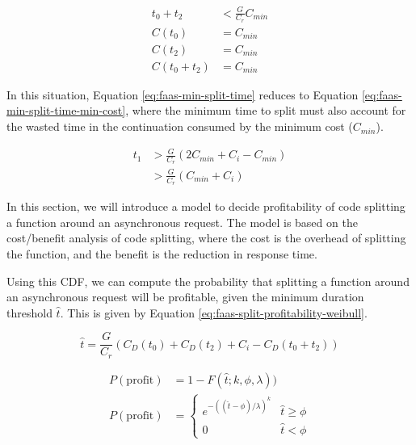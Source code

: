 \begin{equation} \label{eq:faas-min-split-time-pathological-scenario}
\begin{aligned}
t_0 + t_2 & < \frac{G}{C_r} C_{min} \\
C(t_0) & = C_{min} \\
C(t_2) & = C_{min} \\
C(t_0 + t_2) & = C_{min}
\end{aligned}
\end{equation}

In this situation, Equation \ref{eq:faas-min-split-time} reduces to Equation \ref{eq:faas-min-split-time-min-cost}, where the minimum time to split must also account for the wasted time in the continuation consumed by the minimum cost ($C_{min}$).

\begin{equation} \label{eq:faas-min-split-time-min-cost}
\begin{aligned}
t_1 & > \frac{G}{C_r} \left( 2 C_{min} + C_i - C_{min} \right) \\
    & > \frac{G}{C_r} \left( C_{min} + C_i \right)
\end{aligned}
\end{equation}

In this section, we will introduce a model to decide profitability of code splitting a function around an asynchronous request. The model is based on the cost/benefit analysis of code splitting, where the cost is the overhead of splitting the function, and the benefit is the reduction in response time.

Using this CDF, we can compute the probability that splitting a function around an asynchronous request will be profitable, given the minimum duration threshold $\hat{t}$. This is given by Equation \ref{eq:faas-split-profitability-weibull}.

\begin{equation}
\hat{t} = \frac{G}{C_r} \left( C_D(t_0) + C_D(t_2) + C_i - C_D(t_0 + t_2) \right)
\end{equation}

\begin{equation} \label{eq:faas-split-profitability-weibull}
\begin{aligned}
P(\mathrm{profit}) & = 1 - F(\hat{t}; k, \phi, \lambda)) \\
P(\mathrm{profit}) & =
    \begin{cases}
    e^{-((\hat{t} - \phi)/\lambda)^k} & \hat{t} \geq \phi \\
    0 & \hat{t} < \phi
    \end{cases}
\end{aligned}
\end{equation}

